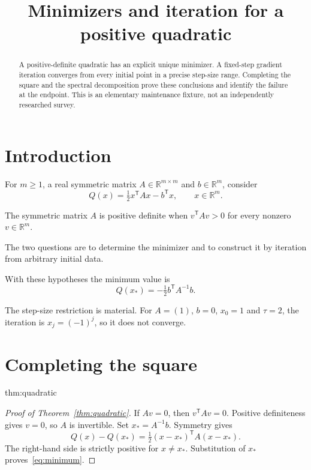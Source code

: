 \documentclass[12pt,reqno]{amsart}
\title[Minimizers and iteration]{Minimizers and iteration for a positive quadratic}
\date{}
\begin{document}
\begin{abstract}
A positive-definite quadratic has an explicit unique minimizer. A fixed-step
gradient iteration converges from every initial point in a precise step-size
range. Completing the square and the spectral decomposition prove these
conclusions and identify the failure at the endpoint. This is an elementary
maintenance fixture, not an independently researched survey.
\end{abstract}
\maketitle
\tableofcontents

\section{Introduction}\label{sec:introduction}
For $m\geq1$, a real symmetric matrix $A\in\mathbb R^{m\times m}$ and
$b\in\mathbb R^m$, consider
\[
Q(x)=\tfrac12 x^{\mathsf T}Ax-b^{\mathsf T}x,\qquad x\in\mathbb R^m.
\]
\begin{definition}
The symmetric matrix $A$ is positive definite when
$v^{\mathsf T}Av>0$ for every nonzero $v\in\mathbb R^m$.
\end{definition}
The two questions are to determine the minimizer and to construct it by
iteration from arbitrary initial data.

\begin{theorem}\label{thm:quadratic}

\end{theorem}
With these hypotheses the minimum value is
\begin{equation}\label{eq:minimum}
Q(x_*)=-\tfrac12 b^{\mathsf T}A^{-1}b.
\end{equation}

\begin{theorem}\label{thm:gradient}

\end{theorem}
The step-size restriction is material. For $A=(1)$, $b=0$, $x_0=1$ and
$\tau=2$, the iteration is $x_j=(-1)^j$, so it does not converge.

\section{Completing the square}\label{sec:square}
\begin{theoremrecall}{thm:quadratic}

\end{theoremrecall}
\begin{proof}[Proof of Theorem~\ref{thm:quadratic}]
If $Av=0$, then $v^{\mathsf T}Av=0$. Positive definiteness gives $v=0$,
so $A$ is invertible. Set $x_*=A^{-1}b$. Symmetry gives
\[
Q(x)-Q(x_*)=\tfrac12(x-x_*)^{\mathsf T}A(x-x_*).
\]
The right-hand side is strictly positive for $x\ne x_*$. Substitution of
$x_*$ proves~\eqref{eq:minimum}.
\end{proof}
\end{document}
